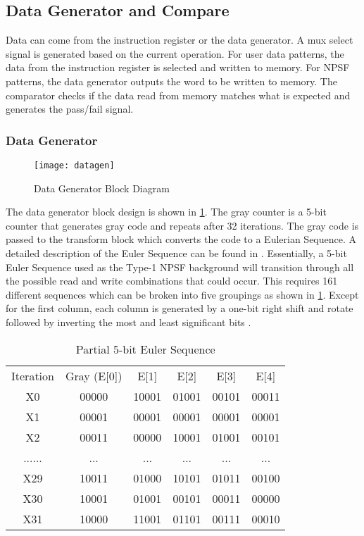 \subsection{Data Generator and Compare}
\label{sect:bg-blocks-data-generator-and-compare-block}
Data can come from the instruction register or the data generator.  A mux select signal is generated based on the current operation.  For user data patterns, the data from the instruction register is selected and written to memory.  For NPSF patterns, the data generator outputs the word to be written to memory.  The comparator checks if the data read from memory matches what is expected and generates the pass/fail signal.

\subsubsection{Data Generator}
\begin{figure}[h!]
  \centering
  \texttt{[image: datagen]}
  \caption{Data Generator Block Diagram}
  \label{fig:datagen}
\end{figure}
The data generator block design is shown in \ref{fig:datagen}.  The gray counter is a 5-bit counter that generates gray code and repeats after 32 iterations.  The gray code is passed to the transform block which converts the code to a Eulerian Sequence.  A detailed description of the Euler Sequence can be found in \cite{1675556}.  Essentially, a 5-bit Euler Sequence used as the Type-1 NPSF background will transition through all the possible read and write combinations that could occur.  This requires 161 different sequences which can be broken into five groupings as shown in \ref{tab:euler}.  Except for the first column, each column is generated by a one-bit right shift and rotate followed by inverting the most and least significant bits \cite{00957583}.

\begin{table}[h]
  \caption{Partial 5-bit Euler Sequence}
  \centering
  \begin{tabular}{c c c c c c}
  \hline\hline
  Iteration    & Gray (E[0]) & E[1]  & E[2]  & E[3]  & E[4]  \\
  X0  & 00000 & 10001 & 01001 & 00101 & 00011 \\
  X1  & 00001 & 00001 & 00001 & 00001 & 00001 \\
  X2  & 00011 & 00000 & 10001 & 01001 & 00101 \\
  ......             & ...   & ...   & ...   & ...   & ...   \\
  X29 & 10011 & 01000 & 10101 & 01011 & 00100 \\
  X30 & 10001 & 01001 & 00101 & 00011 & 00000 \\
  X31 & 10000 & 11001 & 01101 & 00111 & 00010 \\ [0.5ex]
  \end{tabular}
  \label{tab:euler}
\end{table}


